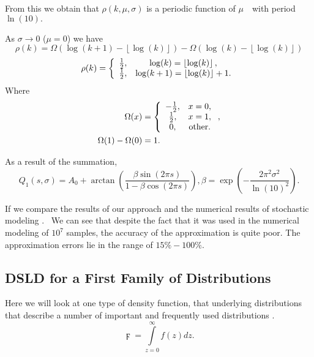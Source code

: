 \documentclass[titlepage,fleqn]{article}%
\begin{document}
From this we obtain that $\rho(k,\mu,\sigma)$ is a periodic function of $\mu
$\ \ with period $\ln(10).$

\bigskip As $\sigma\rightarrow0$ ($\mu=0$) we have%
\[
\rho(k)=\Omega(\log(k+1)-\left\lfloor \log(k)\right\rfloor )-\Omega
(\log(k)-\left\lfloor \log(k)\right\rfloor )
\]%
\[
\rho(k)=\left\{
\begin{array}
[c]{cc}%
\frac{1}{2}, & \log(k)=\left\lfloor \log(k)\right\rfloor ,\\
\frac{1}{2}, & \log(k+1)=\left\lfloor \log(k)\right\rfloor +1.
\end{array}
\right.
\]
Where%
\begin{align*}
\Omega(x)  &  =\left\{
\begin{array}
[c]{cc}%
-\frac{1}{2}, & x=0,\\
\frac{1}{2}, & x=1,\\
0, & \text{other}.
\end{array}
\right.  ,\\
\Omega(1)-\Omega(0)  &  =1.
\end{align*}


As a result of the summation,%
\begin{equation}
Q_{1}\left(  s,\sigma\right)  =A_{0}+\arctan\left(  \frac{\beta\sin(2\pi
s)}{1-\beta\cos(2\pi s)}\right)  ,\beta=\exp\left(  -\frac{2\pi^{2}\sigma^{2}%
}{\ln(10)^{2}}\right)  .
\end{equation}


If we compare the results of our approach and the numerical results of
stochastic modeling
\cite{formann0}%
. \ We can see that despite the fact that it was used in the numerical
modeling of $10^{7}$ samples, the accuracy of the approximation is quite poor.
The approximation errors lie in the range of $15\%-100\%$.

\subsection{DSLD for a First Family of Distributions}%

\label{DfWD}%


Here we will look at one type of density function, that underlying
distributions that describe a number of important and frequently used
distributions
\cite{walck}
.%
\[
\digamma=%
{\displaystyle\int\limits_{z=0}^{\infty}}
f(z)dz.
\]
\end{document}
